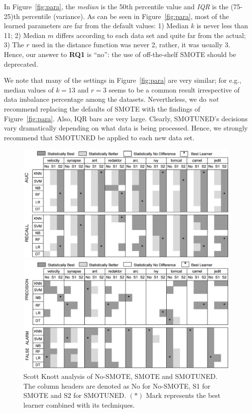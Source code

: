\documentclass[sigconf]{acmart}
\theoremstyle{break}
\newcommand{\sma}{{\sc SMOTE}}
\newcommand{\smb}{{\sc SMOTUNED}}
\begin{document}
 
 In  Figure~\ref{fig:para}, the {\em median} is the 50th percentile
 value and {\em IQR} is the (75-25)th percentile
 (variance).
 As can be seen in Figure~\ref{fig:para}, most of the learned parameters are far from the default values: 1) Median $k$ is never less than 11; 2) Median $m$ differs according to each data set and quite far from the actual; 3) The $r$ used in the distance function was never 2, rather, it was usually 3.
 Hence,  our answer to {\bf RQ1} is ``no'': the use of off-the-shelf {\sma} should be deprecated. 
 
 We note that many of the settings in Figure~\ref{fig:para} are very similar; for e.g., median values of $k=13$ and $r=3$ seems to be a common
result irrespective of data imbalance percentage among the datasets.  Nevertheless, we do {\em not} recommend replacing
the defaults of {\sma} with the findings
of Figure~\ref{fig:para}. Also, IQR bars are
very large. Clearly, {\smb}'s decisions vary dramatically
depending on what data  is being processed.  Hence,
we strongly recommend that {\smb} be applied to each new data set.

\begin{figure}[!t]
\begin{minipage}{.49\linewidth}
\centering
        \includegraphics[width=\linewidth ]{./fig/AUC_recall.png}
            \end{minipage}%
\begin{minipage}{.49\linewidth}
        \centering
        \includegraphics[width=\linewidth]{./fig/prec_pf.png}
    \end{minipage}%
    \caption{Scott Knott analysis of No-SMOTE, SMOTE and SMOTUNED. The column headers are denoted as No for No-SMOTE, S1 for SMOTE and S2 for SMOTUNED. $(\ast)$ Mark represents the best learner combined with its techniques.}
    \label{fig:stats}
\vspace{-0.4cm}
\end{figure}
\end{document}
